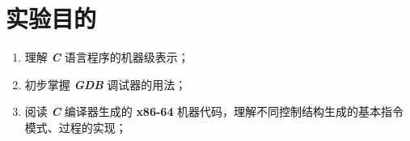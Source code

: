 \section{实验目的}
    \begin{enumerate}
        \item 理解 \textbf{\textit{C}} 语言程序的机器级表示；
        \item 初步掌握 \textbf{\textit{GDB}} 调试器的用法；
        \item 阅读 \textbf{\textit{C}} 编译器生成的 \textbf{x86-64} 机器代码，理解不同控制结构生成的基本指令模式、过程的实现；
    \end{enumerate}